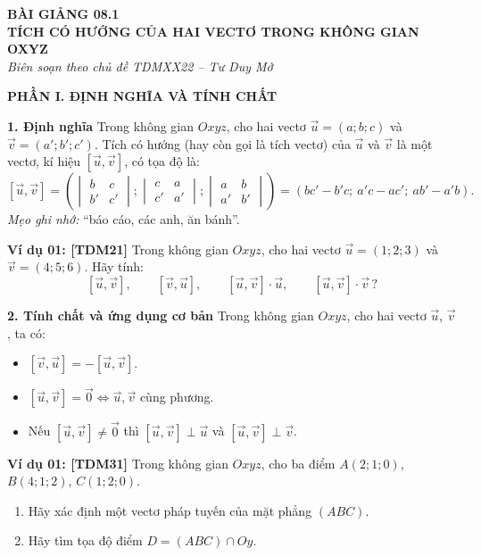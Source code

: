 \documentclass[12pt,a4paper]{article}
\newcommand{\partheading}[1]{\par\vspace{4pt}\noindent\textbf{\textcolor{sectionpurple}{#1}}\par\vspace{1pt}}
\newcommand{\example}[2][TDM22]{\par\vspace{1pt}\noindent\textbf{\textcolor{sectionpurple}{Ví dụ #2:} \textcolor{noteborder}{[#1]}}\enspace}
\newcommand{\tightitem}{\setlength{\itemsep}{0pt}\setlength{\topsep}{1pt}\setlength{\parsep}{0pt}\setlength{\partopsep}{0pt}}
\newcommand{\veczero}{\overrightarrow{0}}
\newcommand{\cross}[2]{\left[\vec{#1},\vec{#2}\right]}
\begin{document}
\fontsize{12}{14.6}\selectfont
\begin{center}
  \textbf{BÀI GIẢNG 08.1}\\[-1pt]
  \textbf{TÍCH CÓ HƯỚNG CỦA HAI VECTƠ TRONG KHÔNG GIAN OXYZ}\\[-2pt]
  {\fontsize{10.5}{12}\selectfont\itshape Biên soạn theo chủ đề TDMXX22 -- Tư Duy Mở}
\end{center}
\vspace{-7pt}

\partheading{PHẦN I. ĐỊNH NGHĨA VÀ TÍNH CHẤT}
\textbf{1. Định nghĩa}
Trong không gian $Oxyz$, cho hai vectơ $\vec u=(a;b;c)$ và $\vec v=(a';b';c')$.
Tích có hướng (hay còn gọi là tích vectơ) của $\vec u$ và $\vec v$ là một vectơ,
kí hiệu $\cross{u}{v}$, có tọa độ là:
\[
\cross{u}{v}
=\left(
\begin{vmatrix}b&c\\b'&c'\end{vmatrix};
\begin{vmatrix}c&a\\c'&a'\end{vmatrix};
\begin{vmatrix}a&b\\a'&b'\end{vmatrix}
\right)
=(bc'-b'c;\ a'c-ac';\ ab'-a'b).
\]
\textit{Mẹo ghi nhớ:} “báo cáo, các anh, ăn bánh”.

\begin{notebox}
\example[TDM21]{01} Trong không gian $Oxyz$, cho hai vectơ
$\vec u=(1;2;3)$ và $\vec v=(4;5;6)$. Hãy tính:
\[
\cross{u}{v},\qquad \cross{v}{u},\qquad
\cross{u}{v}\cdot\vec u,\qquad
\cross{u}{v}\cdot\vec v\,?
\]
\end{notebox}

\textbf{2. Tính chất và ứng dụng cơ bản}
Trong không gian $Oxyz$, cho hai vectơ $\vec u$, $\vec v$, ta có:
\begin{itemize}\tightitem
 \item $\cross{v}{u}=-\cross{u}{v}$.
 \item $\cross{u}{v}=\veczero\iff\vec u,\vec v$ cùng phương.
 \item Nếu $\cross{u}{v}\ne\veczero$ thì $\cross{u}{v}\perp\vec u$ và $\cross{u}{v}\perp\vec v$.
\end{itemize}
\begin{notebox}
\example[TDM31]{01} Trong không gian $Oxyz$, cho ba điểm
$A(2;1;0)$, $B(4;1;2)$, $C(1;2;0)$.
\begin{enumerate}\tightitem
 \item Hãy xác định một vectơ pháp tuyến của mặt phẳng $(ABC)$.
 \item Hãy tìm tọa độ điểm $D=(ABC)\cap Oy$.
\end{enumerate}
\end{notebox}
\end{document}

